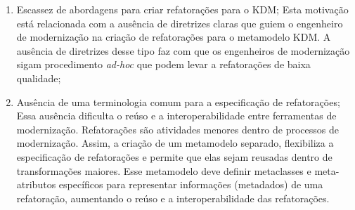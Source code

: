 \begin{enumerate}

\item Escassez de abordagens para criar refatorações para o KDM; Esta motivação está relacionada com a ausência de diretrizes claras que guiem o engenheiro de modernização na criação de refatorações para o metamodelo KDM. A ausência de diretrizes desse tipo faz com que os engenheiros de modernização sigam procedimento \textit{ad-hoc} que podem levar a refatorações de baixa qualidade;






\item Ausência de uma terminologia comum para a especificação de refatorações; Essa ausência dificulta o reúso e a interoperabilidade entre ferramentas de modernização. Refatorações são atividades menores dentro de processos de modernização. Assim, a criação de um metamodelo separado, flexibiliza a especificação de refatorações e permite que elas sejam reusadas dentro de transformações maiores. Esse metamodelo deve definir metaclasses e meta-atributos específicos para representar informações (metadados) de uma refatoração, aumentando o reúso e a interoperabilidade das refatorações. 





\end{enumerate}
